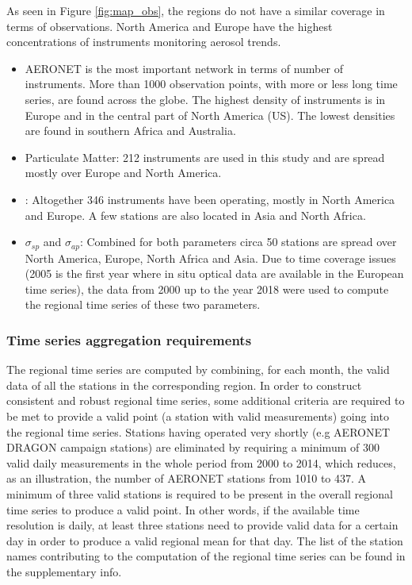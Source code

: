 \documentclass[acp, manuscript]{copernicus}
\begin{document}
As seen in Figure \ref{fig:map_obs}, the regions do not have a similar coverage in terms of observations. North America and Europe have the highest concentrations of instruments monitoring aerosol trends.
\begin{itemize}
 \item AERONET is the most important network in terms of number of instruments. More than 1000 observation points, with more or less long time series, are found across the globe. The highest density of instruments is in Europe and in the central part of North America (US). The lowest densities are found in southern Africa and Australia.
 \item Particulate Matter: 212 instruments are used in this study and are spread mostly over Europe and North America. 
 \item {}: Altogether 346 instruments have been operating, mostly in North America and Europe. A few stations are also located in Asia and North Africa.
 \item $\sigma_{sp}$ and $\sigma_{ap}$: Combined for both parameters circa 50 stations are spread over North America, Europe, North Africa and Asia. Due to time coverage issues (2005 is the first year where in situ optical data are available in the European time series), the data from 2000 up to the year 2018 were used to compute the regional time series of these two parameters.
\end{itemize}


\subsubsection{Time series aggregation requirements}
The regional time series are computed by combining, for each month, the valid data of all the stations in the corresponding region. In order to construct consistent and robust regional time series, some additional criteria are required to be met to provide a valid point (a station with valid measurements) going into the regional time series. Stations having operated very shortly (e.g AERONET DRAGON campaign stations) are eliminated by requiring a minimum of 300 valid daily measurements in the whole period from 2000 to 2014, which reduces, as an illustration, the number of AERONET stations from 1010 to 437. A minimum of three valid stations is required to be present in the overall regional time series to produce a valid point. In other words, if the available time resolution is daily, at least three stations need to provide valid data for a certain day in order to produce a valid regional mean for that day.  The list of the station names contributing to the computation of the regional time series can be found in the supplementary info.
\end{document}
